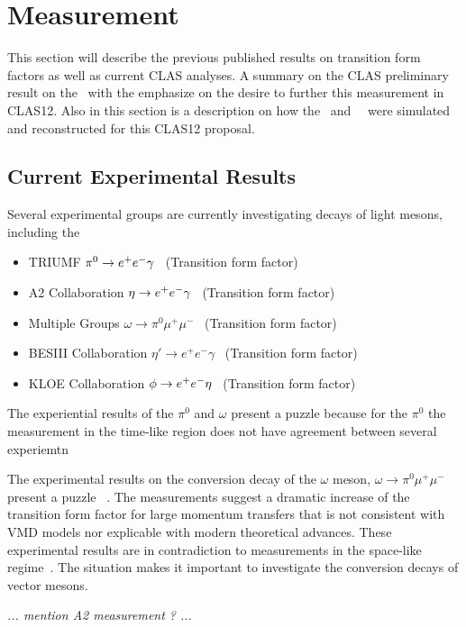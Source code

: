 \section{Measurement}\label{sec:measurement}
This section will describe the previous published results on transition form factors as well as current CLAS analyses. A summary on the CLAS preliminary result on the \etaTP \, with the emphasize on the desire to further this measurement in CLAS12. Also in this section is a description on how the \etaDal \ and \ \phiDal \ were simulated and reconstructed for this CLAS12 proposal.
\subsection{Current Experimental Results}
Several experimental groups are currently investigating decays of light mesons, including the 
\begin{itemize}
	\item TRIUMF $\pi^0 \to e^+e^- \gamma$~\cite{FARZ} (Transition form factor)
	\item A2 Collaboration $\eta \to e^+e^- \gamma$~\cite{Berg,A2} (Transition form factor)
	\item Multiple Groups $\omega\to\pi^0 \mu^+\mu^-$ ~\cite{Dzhelyadin:1980tj,Arnaldi:2009aa,Uras:2011zz}(Transition form factor)
	\item BESIII Collaboration $\eta'\to e^+e^-\gamma $~\cite{Ablikim:2015wnx} (Transition form factor)
	\item KLOE Collaboration $\phi \rightarrow e^+e^- \eta$~\cite{Babusci:2014ldz} (Transition form factor)
\end{itemize}
The experiential results of the $\pi^0$ and $\omega$ present a puzzle because for the $\pi^0$ the measurement in the time-like region does not have agreement between several experiemtn

The experimental results on the conversion decay of the $\omega$ meson, $\omega\to\pi^0 \mu^+\mu^-$  present a puzzle ~\cite{Dzhelyadin:1980tj,Arnaldi:2009aa,Uras:2011zz}. 
The measurements suggest a dramatic increase of the transition form factor for large momentum transfers that is not consistent with VMD models nor explicable with modern theoretical advances. 
These experimental results are in contradiction to measurements in the space-like regime~\cite{Achasov:2013btb}. 
The situation makes it important to investigate the conversion decays of vector mesons. 

{\it ... mention A2 measurement ? ...}

